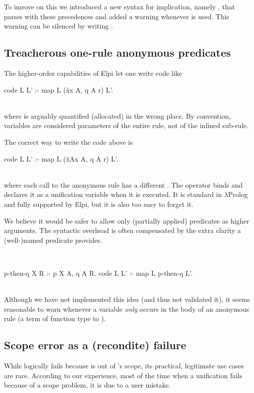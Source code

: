 \documentclass[a4paper, 11pt]{book}
\newenvironment{elpicode}
  {\VerbatimEnvironment~\\\begin{elpibox}\begin{xelpicode}}{\end{xelpicode}
\end{elpibox}\\}
\begin{document}
To imrove on this we introduced a new syntax for implication, namely \elpi{==>},
that parses with these precedences and added a
warning whenever  is used. This warning can be silenced by
writing .

\subsection{Treacherous one-rule anonymous predicates}

The higher-order capabilities of Elpi let one write code like
\begin{elpicode}
code L L' :- map L (x\r\p x A, q A r) L'.
\end{elpicode}
where  is arguably quantified (allocated) in the wrong place. By
convention, variables are considered parameters of the entire rule, not of the
inlined sub-rule.

The correct way to write the code above is
\begin{elpicode}
code L L' :- map L (x\r\sigma A\p x A, q A r) L'.
\end{elpicode}
where each call to the anonymous rule has a different .
The  operator binds  and declares it as
a unification variable when it is executed. It is standard in
$\lambda$Prolog and fully supported by Elpi, but it is also
too easy to forget it.

We believe it would
be safer to allow only (partially applied) predicates as
higher arguments. The syntactic overhead is often compensated by the extra
clarity a (well-)named predicate provides.

\begin{elpicode}
p-then-q X R :- p X A, q A R.
code L L' :- map L p-then-q L'.
\end{elpicode}
Although we have not implemented this idea (and thus not validated it), it
seems reasonable to warn whenever a variable \emph{only} occurs in the body of
an anonymous rule (a term of function type to ).

\subsection{Scope error as a (recondite) failure}

While  logically fails because  is out of 's
scope, its
practical, legitimate use cases are rare. According to our experience, most
of the time when a unification fails because of a scope problem, it is due to
a user mistake.
\end{document}
